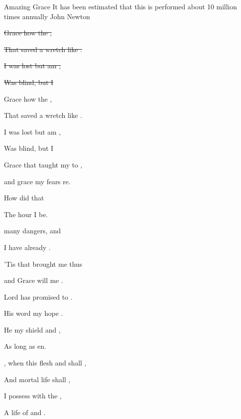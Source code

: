 \begin{SBSong}{Amazing Grace}
  {It has been estimated that this is performed about 10 million times annually}
  {John Newton}
  \begin{SBVerse}
    \sout{ Grace how  the ,}

    \sout{That saved a wretch like .}
    
    \sout{I  was lost but  am ,}

    \sout{Was blind, but  I }
  \end{SBVerse}
  \begin{SBVerse}
     Grace how  the ,

    That saved a wretch like .
    
    I  was lost but  am ,

    Was blind, but  I 
  \end{SBVerse}
  \begin{SBVerse}
 	 Grace that taught my  to ,

    and grace my fears re.

    How  did that  

    The hour I  be.
  \end{SBVerse}
  \begin{SBVerse}
     many dangers,  and 
    
    I have already .
    
    'Tis  that brought me  thus 
    
    and Grace will  me . 
  \end{SBVerse}
  \begin{SBVerse}
     Lord has promised  to .
    
    His word my hope .
    
    He  my shield and  ,
    
    As long as  en.
  \end{SBVerse}
  \begin{SBVerse}
    , when this flesh and  shall ,

    And mortal life shall ,

    I  possess with the ,

    A life of  and .
  \end{SBVerse}
\end{SBSong}
